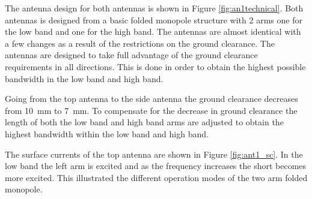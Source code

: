The antenna design for both antennas is shown in Figure \ref{fig:an1technical}. Both antennas is designed from a basic folded monopole structure with 2 arms one for the low band and one for the high band. The antennas are almost identical with a few changes as a result of the restrictions on the ground clearance.
The antennas are designed to take full advantage of the ground clearance requirements in all directions. This is done in order to obtain the highest possible bandwidth in the low band and high band. 

Going from the top antenna to the side antenna the ground clearance decreases from \SI{10}{mm} to \SI{7}{mm}. To compensate for the decrease in ground clearance the length of both the low band and high band arms are adjusted to obtain the highest bandwidth within the low band and high band. 

The surface currents of the top antenna are shown in Figure \ref{fig:ant1_sc}. In the low band the left arm is excited and as the frequency increases the short becomes more excited. This illustrated the different operation modes of the two arm folded monopole.   


